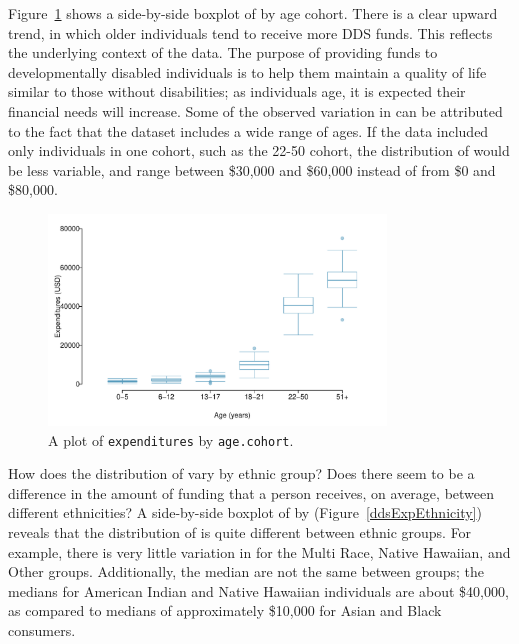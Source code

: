Figure~\ref{ddsExpAge} shows a side-by-side boxplot of  by age cohort. There is a clear upward trend, in which older individuals tend to receive more DDS funds. This reflects the underlying context of the data. The purpose of providing funds to developmentally disabled individuals is to help them maintain a quality of life similar to those without disabilities; as individuals age, it is expected their financial needs will increase. Some of the observed variation in  can be attributed to the fact that the dataset includes a wide range of ages. If the data included only individuals in one cohort, such as the 22-50 cohort, the distribution of  would be less variable, and range between \$30,000 and \$60,000 instead of from \$0 and \$80,000.

\begin{figure}[h]
	\centering
	\includegraphics[width=0.8\textwidth]{ch_intro_to_data_oi_biostat/figures/ddsExpAge/ddsExpAge}
	\caption{A plot of \texttt{expenditures} by \texttt{age.cohort}. }
	\label{ddsExpAge}
\end{figure}

How does the distribution of  vary by ethnic group? Does there seem to be a difference in the amount of funding that a person receives, on average, between different ethnicities? A side-by-side boxplot of  by  (Figure~\ref{ddsExpEthnicity}) reveals that the distribution of  is quite different between ethnic groups. For example, there is very little variation in  for the Multi Race, Native Hawaiian, and Other groups. Additionally, the median  are not the same between groups; the medians for American Indian and Native Hawaiian individuals are about \$40,000, as compared to medians of approximately \$10,000 for Asian and Black consumers.   

